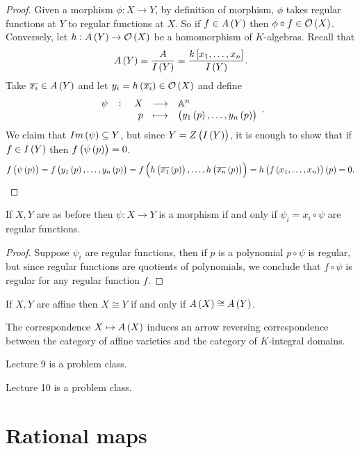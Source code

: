 \begin{proof}
Given a morphism $ \phi : X \to Y $, by definition of morphism, $ \phi $ takes regular functions at $ Y $ to regular functions at $ X $. So if $ f \in A\br{Y} $ then $ \phi \circ f \in \OO\br{X} $. Conversely, let $ h : A\br{Y} \to \OO\br{X} $ be a homomorphism of $ K $-algebras. Recall that
$$ A\br{Y} = \dfrac{A}{I\br{Y}} = \dfrac{k\sbr{x_1, \dots, x_n}}{I\br{Y}}. $$
Take $ \overline{x_i} \in A\br{Y} $ and let $ y_i = h\br{\overline{x_i}} \in \OO\br{X} $ and define
$$ \function[\psi]{X}{\A^n}{p}{\br{y_1\br{p}, \dots, y_n\br{p}}}. $$
We claim that $ Im\br{\psi} \subseteq Y $, but since $ Y = Z\br{I\br{Y}} $, it is enough to show that if $ f \in I\br{Y} $ then $ f\br{\psi\br{p}} = 0 $.
$$ f\br{\psi\br{p}} = f\br{y_1\br{p}, \dots, y_n\br{p}} = f\br{h\br{\overline{x_1}\br{p}}, \dots, h\br{\overline{x_n}\br{p}}} = h\br{f\br{x_1, \dots, x_n}}\br{p} = 0. $$
\end{proof}

\begin{lemma}
If $ X, Y $ are as before then $ \psi : X \to Y $ is a morphism if and only if $ \psi_i = x_i \circ \psi $ are regular functions.
\end{lemma}

\begin{proof}
Suppose $ \psi_i $ are regular functions, then if $ p $ is a polynomial $ p \circ \psi $ is regular, but since regular functions are quotients of polynomials, we conclude that $ f \circ \psi $ is regular for any regular function $ f $.
\end{proof}

\begin{corollary}
If $ X, Y $ are affine then $ X \cong Y $ if and only if $ A\br{X} \cong A\br{Y} $.
\end{corollary}

\begin{corollary}
The correspondence $ X \mapsto A\br{X} $ induces an arrow reversing correspondence between the category of affine varieties and the category of $ K $-integral domains.
\end{corollary}


Lecture 9 is a problem class.


Lecture 10 is a problem class.

\pagebreak

\section{Rational maps}

